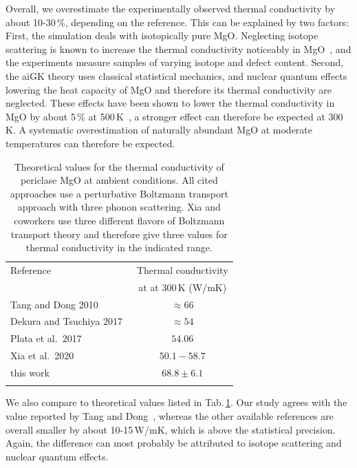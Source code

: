 Overall, we overestimate the experimentally observed thermal conductivity by about 10-30\,\%, depending on the reference. This can be explained by two factors: First, the simulation deals with isotopically pure MgO. Neglecting isotope scattering is known to increase the thermal conductivity noticeably in MgO~\cite{slack1962,tang2010}, and the experiments measure samples of varying isotope and defect content. Second, the aiGK theory uses classical statistical mechanics, and nuclear quantum effects lowering the heat capacity of MgO and therefore its thermal conductivity are neglected. These effects have been shown to lower the thermal conductivity in MgO by about 5\,\% at 500\,K~\cite{Puligheddu2019}, a stronger effect can therefore be expected at 300\,K. A systematic overestimation of naturally abundant MgO at moderate temperatures can therefore be expected.
\begin{table}[ht]
  \centering
  \selectfont
  \begin{tabular}{lc}
    \toprule
    Reference & Thermal conductivity \\
    & at at 300\,K (W/mK) \\
    \midrule
    Tang and Dong 2010~\cite{tang2010} & $\approx 66$ \\
    Dekura and Tsuchiya 2017~\cite{dekura2017} & $\approx 54$ \\
    Plata et al.~2017~\cite{AAPL} & $54.06$ \\
    Xia et al.~2020~\cite{xia2020} & $50.1-58.7$ \\
    this work & $68.8 \pm 6.1$ \\
    \bottomrule
    \vspace{.5em}
  \end{tabular}
  \caption{Theoretical values for the thermal conductivity of periclase MgO at ambient conditions. All cited approaches use a perturbative Boltzmann transport approach with three phonon scattering. Xia and coworkers use three different flavors of Boltzmann transport theory and therefore give three values for thermal conductivity in the indicated range.}
  \label{tab:theo.MgO}
\end{table}
We also compare to theoretical values listed in Tab.\,\ref{tab:theo.MgO}.
Our study agrees with the value reported by Tang and Dong~\cite{tang2010}, whereas the other available references are overall smaller by about 10-15\,W/mK, which is above the statistical precision. Again, the difference can most probably be attributed to isotope scattering and nuclear quantum effects.

